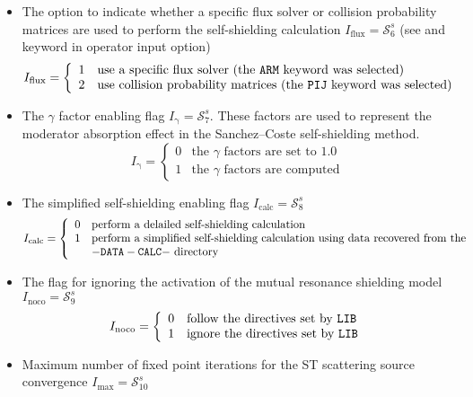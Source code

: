 \begin{itemize}
\item The option to indicate whether a specific flux solver or collision probability matrices
are used to perform the self-shielding calculation $I_{\mathrm{flux}}=\mathcal{S}^{s}_{6}$
(see  and  keyword in  operator input option)
\begin{displaymath}
I_{\mathrm{flux}} = \left\{
\begin{array}{rl}
 1 & \textrm{use a specific flux solver (the \moc{ARM} keyword was selected)} \\
 2 & \textrm{use collision probability matrices (the \moc{PIJ} keyword was selected)} 
\end{array} \right.
\end{displaymath}

\item The $\gamma$ factor enabling flag $I_{\mathrm{\gamma}}=\mathcal{S}^{s}_{7}$. These factors
are used to represent the moderator absorption effect in the Sanchez--Coste self-shielding method.
\begin{displaymath}
I_{\mathrm{\gamma}} = \left\{
\begin{array}{ll}
0 & \textrm{the $\gamma$ factors are set to 1.0} \\
1 & \textrm{the $\gamma$ factors are computed}
\end{array} \right.
\end{displaymath}

\item The simplified self-shielding enabling flag $I_{\mathrm{calc}}=\mathcal{S}^{s}_{8}$ 
\begin{displaymath}
I_{\mathrm{calc}} = \left\{
\begin{array}{ll}
0 & \textrm{perform a delailed self-shielding calculation} \\
1 & \textrm{perform a simplified self-shielding calculation using data recovered from the} \\
 & {\tt -DATA-CALC-} \textrm{ directory}
\end{array} \right.
\end{displaymath}

\item The flag for ignoring the activation of the mutual resonance shielding model $I_{\mathrm{noco}}=\mathcal{S}^{s}_{9}$ 
\begin{displaymath}
I_{\mathrm{noco}} = \left\{
\begin{array}{ll}
0 & \textrm{follow the directives set by {\tt LIB}} \\
1 & \textrm{ignore the directives set by {\tt LIB}}
\end{array} \right.
\end{displaymath}

\item Maximum number of fixed point iterations for the ST scattering source convergence $I_{\mathrm{max}}=\mathcal{S}^{s}_{10}$ 

\end{itemize}

